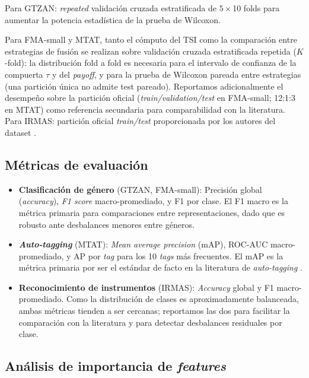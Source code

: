 \documentclass[conference]{IEEEtran}
\begin{document}
Para GTZAN: \textit{repeated} validación cruzada estratificada de $5 \times$10 folds para aumentar la potencia estadística de la prueba de Wilcoxon.

Para FMA-small y MTAT, tanto el cómputo del TSI como la comparación entre estrategias de fusión se realizan sobre validación cruzada estratificada repetida ($K$-fold): la distribución fold a fold es necesaria para el intervalo de confianza de la compuerta $\tau$ y del \textit{payoff}, y para la prueba de Wilcoxon pareada entre estrategias (una partición única no admite test pareado). Reportamos adicionalmente el desempeño sobre la partición oficial (\textit{train/validation/test} en FMA-small; 12:1:3 en MTAT) como referencia secundaria para comparabilidad con la literatura.
Para IRMAS: partición oficial \textit{train/test} proporcionada por los autores del dataset \cite{bosch2012comparison}.

\subsection{Métricas de evaluación}

\begin{itemize}
    \item \textbf{Clasificación de género} (GTZAN, FMA-small): Precisión global (\textit{accuracy}), \textit{F1 score} macro-promediado, y F1 por clase. El F1 macro es la métrica primaria para comparaciones entre representaciones, dado que es robusto ante 
    desbalances menores entre géneros.

    \item \textbf{\textit{Auto-tagging}} (MTAT): \textit{Mean average precision} (mAP), ROC-AUC macro-promediado, y AP por \textit{tag} para los 10 \textit{tags} más frecuentes. El mAP es la métrica primaria por ser el estándar de facto en la literatura de 
    \textit{auto-tagging} \cite{law2009evaluation}.

    \item \textbf{Reconocimiento de instrumentos} (IRMAS): \textit{Accuracy} global y F1 macro-promediado. Como la distribución de clases es aproximadamente balanceada, ambas métricas tienden a ser cercanas; reportamos las dos para facilitar la comparación con la literatura y para detectar desbalances residuales por clase.
\end{itemize}


\subsection{Análisis de importancia de \textit{features}}
\label{sec:importancia}
\end{document}
